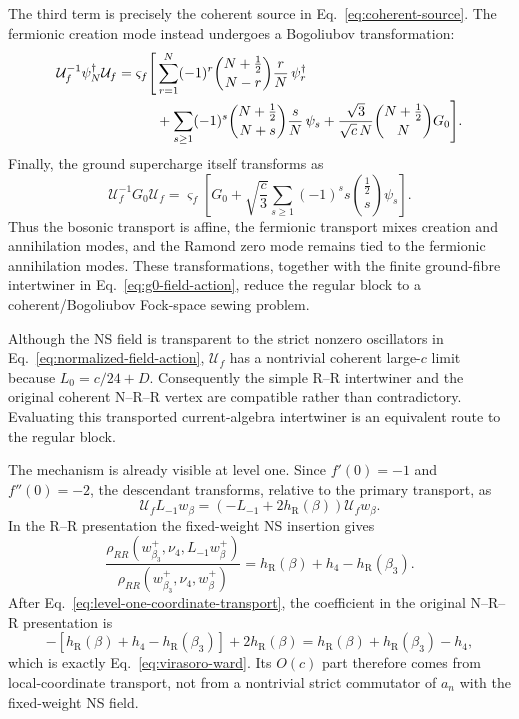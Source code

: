 \documentclass[11pt]{article}
\newcommand{\R}{\mathrm R}
\begin{document}
The third term is precisely the coherent source in
Eq.~\eqref{eq:coherent-source}.  The fermionic creation mode instead
undergoes a Bogoliubov transformation:
\begin{align}
 \mathcal U_f^{-1}\psi_N^\dagger\mathcal U_f
 =\varsigma_f\Bigg[
 &\sum_{r=1}^{N}(-1)^r
 \binom{N+\frac12}{N-r}\frac rN\,\psi_r^\dagger
 \notag\\
 &+
 \sum_{s\geq1}(-1)^s
 \binom{N+\frac12}{N+s}\frac sN\,\psi_s
 +
 \frac{\sqrt3}{\sqrt c\,N}
 \binom{N+\frac12}{N}G_0
 \Bigg].
 \label{eq:explicit-fermionic-transport}
\end{align}
Finally, the ground supercharge itself transforms as
\begin{equation}
 \mathcal U_f^{-1}G_0\mathcal U_f
 =
 \varsigma_f\left[
 G_0+\sqrt{\frac c3}
 \sum_{s\geq1}(-1)^s s\binom{\frac12}{s}\psi_s
 \right].
 \label{eq:explicit-g0-transport}
\end{equation}
Thus the bosonic transport is affine, the fermionic transport mixes
creation and annihilation modes, and the Ramond zero mode remains tied
to the fermionic annihilation modes.  These transformations, together
with the finite ground-fibre intertwiner in
Eq.~\eqref{eq:g0-field-action}, reduce the regular block to a
coherent/Bogoliubov Fock-space sewing problem.

Although
the NS field is transparent to the strict nonzero oscillators in
Eq.~\eqref{eq:normalized-field-action}, \(\mathcal U_f\) has a
nontrivial coherent large-\(c\) limit because \(L_0=c/24+D\).
Consequently the simple R--R intertwiner and the original coherent
N--R--R vertex are compatible rather than contradictory.  Evaluating
this transported current-algebra intertwiner is an equivalent route
to the regular block.

The mechanism is already visible at level one.  Since
\(f'(0)=-1\) and \(f''(0)=-2\), the descendant transforms, relative
to the primary transport, as
\begin{equation}
 \mathcal U_fL_{-1}w_\beta
 =
 \left(-L_{-1}+2h_\R(\beta)\right)\mathcal U_fw_\beta.
 \label{eq:level-one-coordinate-transport}
\end{equation}
In the R--R presentation the fixed-weight NS insertion gives
\[
 \frac{\rho_{RR}(w_{\beta_3}^+,\nu_4,L_{-1}w_\beta^+)}
 {\rho_{RR}(w_{\beta_3}^+,\nu_4,w_\beta^+)}
 =
 h_\R(\beta)+h_4-h_\R(\beta_3).
\]
After Eq.~\eqref{eq:level-one-coordinate-transport}, the coefficient
in the original N--R--R presentation is
\begin{equation}
 -\left[h_\R(\beta)+h_4-h_\R(\beta_3)\right]
 +2h_\R(\beta)
 =
 h_\R(\beta)+h_\R(\beta_3)-h_4,
 \label{eq:transport-reproduces-coherent-source}
\end{equation}
which is exactly Eq.~\eqref{eq:virasoro-ward}.  Its \(O(c)\) part
therefore comes from local-coordinate transport, not from a
nontrivial strict commutator of \(a_n\) with the fixed-weight NS field.
\end{document}
